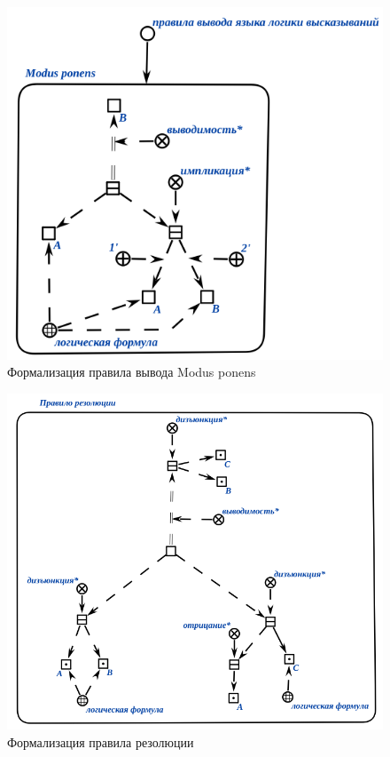 \begin{figure}[H]
	\includegraphics[scale=0.8]{author/part3/figures/Modus_ponens.png}
	\caption{Формализация правила вывода Modus ponens}
	\label{fig:modus_ponens}
\end{figure}

\begin{figure}[H]
	\includegraphics[scale=0.8]{author/part3/figures/resolution.png}
	\caption{Формализация правила резолюции}
	\label{fig:modus_ponens}
\end{figure}

